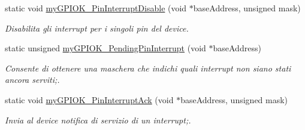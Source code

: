 \begin{DoxyCompactItemize}
static void \hyperlink{group___linux-_driver_ga57efe4a8be5e162cfd2e98f61d195087}{my\+G\+P\+I\+O\+K\+\_\+\+Pin\+Interrupt\+Disable} (void $\ast$base\+Address, unsigned mask)
\begin{DoxyCompactList}\small\item\em Disabilita gli interrupt per i singoli pin del device. \end{DoxyCompactList}\item 
static unsigned \hyperlink{group___linux-_driver_ga6019e1ca45d7a093e1e7fc546b16f773}{my\+G\+P\+I\+O\+K\+\_\+\+Pending\+Pin\+Interrupt} (void $\ast$base\+Address)
\begin{DoxyCompactList}\small\item\em Consente di ottenere una maschera che indichi quali interrupt non siano stati ancora serviti;. \end{DoxyCompactList}\item 
static void \hyperlink{group___linux-_driver_ga105156c3db48f9dd40300218e7d8e144}{my\+G\+P\+I\+O\+K\+\_\+\+Pin\+Interrupt\+Ack} (void $\ast$base\+Address, unsigned mask)
\begin{DoxyCompactList}\small\item\em Invia al device notifica di servizio di un interrupt;. \end{DoxyCompactList}\end{DoxyCompactItemize}
